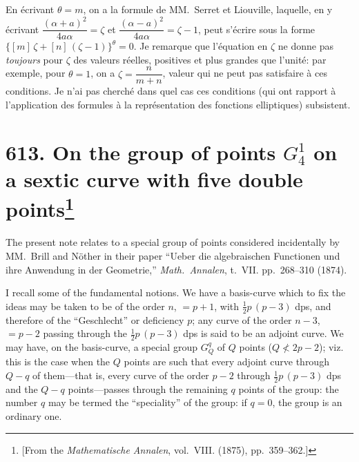 \documentclass[11pt,a4paper]{book}
\begin{document}
En \'{e}crivant $\theta = m$, on a la formule de MM.~Serret et Liouville, laquelle, en y \'{e}crivant $\dfrac{(\alpha+a)^2}{4a\alpha} = \zeta$ et $\dfrac{(\alpha-a)^2}{4a\alpha} = \zeta - 1$, peut s'\'{e}crire sous la forme $\{[m]\,\zeta + [n]\,(\zeta-1)\}^\theta = 0$. Je remarque que l'\'{e}quation en $\zeta$ ne donne pas \textit{toujours} pour $\zeta$ des valeurs r\'{e}elles, positives et plus grandes que l'unit\'{e}: par exemple, pour $\theta = 1$, on a $\zeta = \dfrac{n}{m+n}$, valeur qui ne peut pas satisfaire \`{a} ces conditions. Je n'ai pas cherch\'{e} dans quel cas ces conditions (qui ont rapport \`{a} l'application des formules \`{a} la repr\'{e}sentation des fonctions elliptiques) subsistent.

\newpage
\section[On the group of points $G_4^1$ on a sextic curve with five double points]{\textbf{613.} On the group of points $G_4^1$ on a sextic curve with five double points\footnote{[From the \textit{Mathematische Annalen}, vol.~VIII. (1875), pp.~359--362.]}}

The present note relates to a special group of points considered incidentally by MM.~Brill and N\"{o}ther in their paper ``Ueber die algebraischen Functionen und ihre Anwendung in der Geometrie,'' \textit{Math.~Annalen}, t.~VII. pp.~268--310 (1874).

I recall some of the fundamental notions. We have a basis-curve which to fix the ideas may be taken to be of the order $n$, $= p+1$, with $\frac{1}{2}p\,(p-3)$ dps, and therefore of the ``Geschlecht'' or deficiency $p$; any curve of the order $n-3$, $= p-2$ passing through the $\frac{1}{2}p\,(p-3)$ dps is said to be an adjoint curve. We may have, on the basis-curve, a special group $G_Q^q$ of $Q$ points ($Q \nless 2p-2$); viz. this is the case when the $Q$ points are such that every adjoint curve through $Q-q$ of them---that is, every curve of the order $p-2$ through $\frac{1}{2}p\,(p-3)$ dps and the $Q-q$ points---passes through the remaining $q$ points of the group: the number $q$ may be termed the ``speciality'' of the group: if $q = 0$, the group is an ordinary one.
\end{document}
